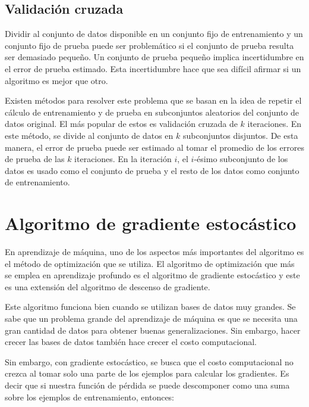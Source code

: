 \subsection{Validación cruzada}
Dividir al conjunto de datos disponible en un conjunto fijo de entrenamiento y un conjunto fijo de prueba puede ser problemático si el conjunto de prueba resulta ser demasiado pequeño. Un conjunto de prueba pequeño implica incertidumbre en el error de prueba estimado. Esta incertidumbre hace que sea difícil afirmar si un algoritmo es mejor que otro. 

\vspace{1em}

Existen métodos para resolver este problema que se basan en la idea de repetir el cálculo de entrenamiento y de prueba en subconjuntos aleatorios del conjunto de datos original. El más popular de estos es validación cruzada de $k$ iteraciones. En este método, se divide al conjunto de datos en $k$ subconjuntos disjuntos. De esta manera, el error de prueba puede ser estimado al tomar el promedio de los errores de prueba de las $k$ iteraciones. En la iteración $i$, el $i$-ésimo subconjunto de los datos es usado como el conjunto de prueba y el resto de los datos como conjunto de entrenamiento.
\cite{goodfellow-et-al-2016}
\cite{hastie01statisticallearning}


\section{Algoritmo de gradiente estocástico}
En aprendizaje de máquina, uno de los aspectos más importantes del algoritmo es el método de optimización que se utiliza. El algoritmo de optimización que más se emplea en aprendizaje profundo es el algoritmo de gradiente estocástico y este es una extensión del algoritmo de descenso de gradiente. 

\vspace{1em}

Este algoritmo funciona bien cuando se utilizan bases de datos muy grandes. Se sabe que un problema grande del aprendizaje de máquina es que se necesita una gran cantidad de datos para obtener buenas generalizaciones. Sin embargo, hacer crecer las bases de datos también hace crecer el costo computacional.
\cite{goodfellow-et-al-2016}

\vspace{1em}

Sin embargo, con gradiente estocástico, se busca que el costo computacional no crezca al tomar solo una parte de los ejemplos para calcular los gradientes. Es decir que si nuestra función de pérdida se puede descomponer como una suma sobre los ejemplos de entrenamiento, entonces:

